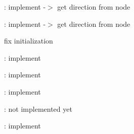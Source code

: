 \begin{DoxyRefList}
%
\+: implement -\/$>$ get direction from node  
\item[Member \mbox{\hyperlink{classec_1_1_directional_light_af7bdf6f7576f38b48a8b6aa7301ef04e}{ec\+::Directional\+Light\+::get\+Direction}} () const]\label{todo__todo000008}%
%
\+: implement -\/$>$ get direction from node  
\item[Member \mbox{\hyperlink{classec_1_1_dynamic_line_geometry_a4dced137976fc7b936bc80a8cb350b38}{ec\+::Dynamic\+Line\+Geometry\+::init\+Vertices}} ()]\label{todo__todo000007}%
%
fix initialization  
\item[Class \mbox{\hyperlink{classec_1_1_spot_light}{ec\+::Spot\+Light}} ]\label{todo__todo000006}%
%
\+: implement  
\item[Class \mbox{\hyperlink{classec_1_1_point_light}{ec\+::Point\+Light}} ]\label{todo__todo000005}%
%
\+: implement  
\item[Class \mbox{\hyperlink{classec_1_1_omni_light}{ec\+::Omni\+Light}} ]\label{todo__todo000004}%
%
\+: implement  
\item[Class \mbox{\hyperlink{classec_1_1_light_system}{ec\+::Light\+System}} ]\label{todo__todo000003}%
%
\+: not implemented yet  
\item[Class \mbox{\hyperlink{classec_1_1_directional_light}{ec\+::Directional\+Light}} ]\label{todo__todo000002}%
%
\+: implement 
\end{DoxyRefList}